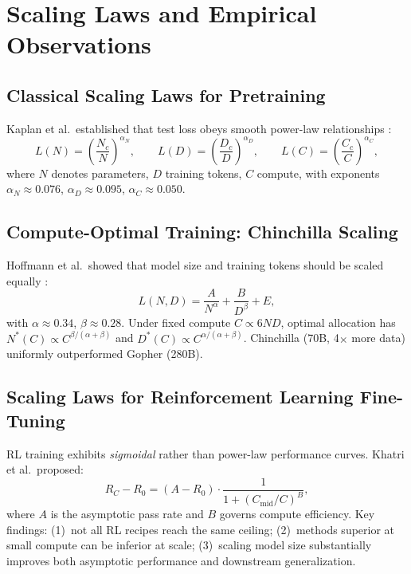 \documentclass[12pt,a4paper]{report}
\begin{document}
\section{Scaling Laws and Empirical Observations}
\label{sec:scaling-laws}

\subsection{Classical Scaling Laws for Pretraining}

Kaplan et al.\ established that test loss obeys smooth power-law relationships \cite{kaplan2020scaling}:
\begin{equation}
  L(N) = \left(\frac{N_c}{N}\right)^{\!\alpha_N}\!,\qquad
  L(D) = \left(\frac{D_c}{D}\right)^{\!\alpha_D}\!,\qquad
  L(C) = \left(\frac{C_c}{C}\right)^{\!\alpha_C}\!,
  \label{eq:kaplan-power-laws}
\end{equation}
where $N$ denotes parameters, $D$ training tokens, $C$ compute, with exponents $\alpha_N \approx 0.076$, $\alpha_D \approx 0.095$, $\alpha_C \approx 0.050$.

\subsection{Compute-Optimal Training: Chinchilla Scaling}

Hoffmann et al.\ showed that model size and training tokens should be scaled equally \cite{hoffmann2022chinchilla}:
\begin{equation}
  L(N, D) = \frac{A}{N^{\alpha}} + \frac{B}{D^{\beta}} + E,
  \label{eq:chinchilla}
\end{equation}
with $\alpha \approx 0.34$, $\beta \approx 0.28$. Under fixed compute $C \propto 6ND$, optimal allocation has $N^*(C)\propto C^{\beta/(\alpha+\beta)}$ and $D^*(C)\propto C^{\alpha/(\alpha+\beta)}$. Chinchilla (70B, 4$\times$ more data) uniformly outperformed Gopher (280B).

\subsection{Scaling Laws for Reinforcement Learning Fine-Tuning}

RL training exhibits \emph{sigmoidal} rather than power-law performance curves. Khatri et al.\ proposed:
\begin{equation}
  R_C - R_0 = (A - R_0) \cdot \frac{1}{1 + (C_{\text{mid}} / C)^B},
  \label{eq:rl-sigmoid}
\end{equation}
where $A$ is the asymptotic pass rate and $B$ governs compute efficiency. Key findings: (1)~not all RL recipes reach the same ceiling; (2)~methods superior at small compute can be inferior at scale; (3)~scaling model size substantially improves both asymptotic performance and downstream generalization.
\end{document}
